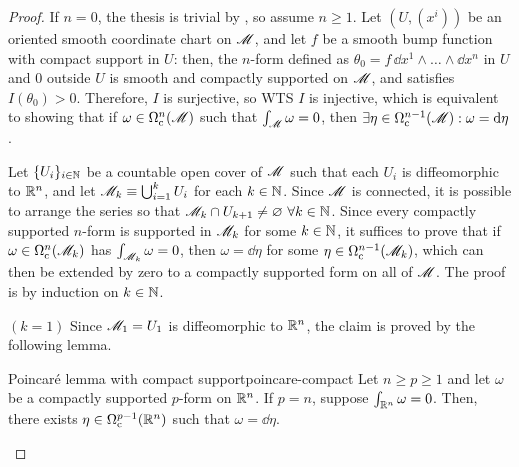 \begin{proofbox}
  \begin{proof}
    If $ n = 0 $, the thesis is trivial by , so assume $ n \geq 1 $. Let $ (U,(x^i)) $ be an oriented smooth coordinate chart on $ \mathscr{M} $, and let $ f $ be a smooth bump function with compact support in $ U $: then, the $ n $-form defined as $ \theta_0 = f \, \dd x^1 \wedge \dots \wedge \dd x^n $ in $ U $ and $ 0 $ outside $ U $ is smooth and compactly supported on $ \mathscr{M} $, and satisfies $ I(\theta_0) > 0 $. Therefore, $ I $ is surjective, so WTS $ I $ is injective, which is equivalent to showing that if $ \omega \in \Omega_\text{c}^{n}(\mathscr{M}) $ such that $ \int_\mathscr{M} \omega = 0 $, then $ \exists \eta \in \Omega_\text{c}^{n-1}(\mathscr{M}) : \omega = \mathrm{d} \eta $.

    Let $ \{U_i\}_{i \in \mathbb{N}} $ be a countable open cover of $ \mathscr{M} $ such that each $ U_i $ is diffeomorphic to $ \mathbb{R}^n $, and let $ \mathscr{M}_k \equiv \bigcup_{i = 1}^k U_i $ for each $ k \in \mathbb{N} $. Since $ \mathscr{M} $ is connected, it is possible to arrange the series so that $ \mathscr{M}_k \cap U_{k+1} \neq \varnothing \,\,\forall k \in \mathbb{N} $. Since every compactly supported $ n $-form is supported in $ \mathscr{M}_k $ for some $ k \in \mathbb{N} $, it suffices to prove that if $ \omega \in \Omega_\text{c}^{n}(\mathscr{M}_k) $ has $ \int_{\mathscr{M}_k} \omega = 0 $, then $ \omega = \dd \eta $ for some $ \eta \in \Omega_\text{c}^{n-1}(\mathscr{M}_k) $, which can then be extended by zero to a compactly supported form on all of $ \mathscr{M} $. The proof is by induction on $ k \in \mathbb{N} $.

    $ (k = 1) $ Since $ \mathscr{M}_1 = U_1 $ is diffeomorphic to $ \mathbb{R}^n $, the claim is proved by the following lemma.

    \begin{lemma}{Poincaré lemma with compact support}{poincare-compact}
      Let $ n \geq p \geq 1 $ and let $ \omega $ be a compactly supported $ p $-form on $ \mathbb{R}^n $. If $ p = n $, suppose $ \int_{\mathbb{R}^n} \omega = 0 $. Then, there exists $ \eta \in \Omega_\text{c}^{p-1}(\mathbb{R}^n) $ such that $ \omega = \dd \eta $.
    \end{lemma}


\end{proof}
\end{proofbox}
